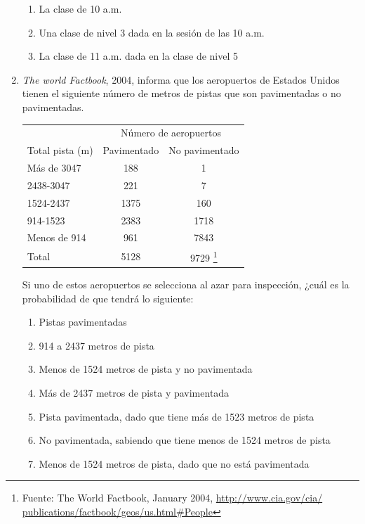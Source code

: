 \documentclass[10pt,twoside]{article}
\begin{document}
\begin{enumerate}
\begin{enumerate}
\item La clase de 10 a.m.
\item Una clase de nivel 3 dada en la sesión de las 10 a.m.
\item La clase de 11 a.m. dada en la clase de nivel 5
\end{enumerate}
\item \textit{The world Factbook}, 2004, informa que los aeropuertos de Estados Unidos tienen el siguiente número de metros de pistas que son pavimentadas o no pavimentadas.
\begin{center}
\begin{tabular}{lcc}
 & \multicolumn{2}{c}{Número de aeropuertos} \cline{2-3} \\ 
Total pista (m) & Pavimentado & No pavimentado \\\hline 
Más de 3047 & 188 & 1 \\ 
2438-3047 & 221 & 7 \\ 
1524-2437 & 1375 & 160 \\ 
914-1523 & 2383 & 1718 \\ 
Menos de 914 & 961 & 7843 \\ \hline
Total & 5128 & 9729 \footnote{Fuente: The World Factbook, January 2004, \url{http://www.cia.gov/cia/
publications/factbook/geos/us.html\#People}
}\\ 
\hline 
\end{tabular} 
\end{center}
Si uno de estos aeropuertos se selecciona al azar para inspección, ¿cuál es la probabilidad de que tendrá lo siguiente:
\begin{enumerate}
\item Pistas pavimentadas
\item 914 a 2437 metros de pista
\item Menos de 1524 metros de pista y no pavimentada
\item Más de 2437 metros de pista y pavimentada
\item Pista pavimentada, dado que tiene más de 1523 metros de pista
\item No pavimentada, sabiendo que tiene menos de 1524 metros de pista
\item Menos de 1524 metros de pista, dado que no está pavimentada
\end{enumerate}
\end{enumerate}
\end{document}
